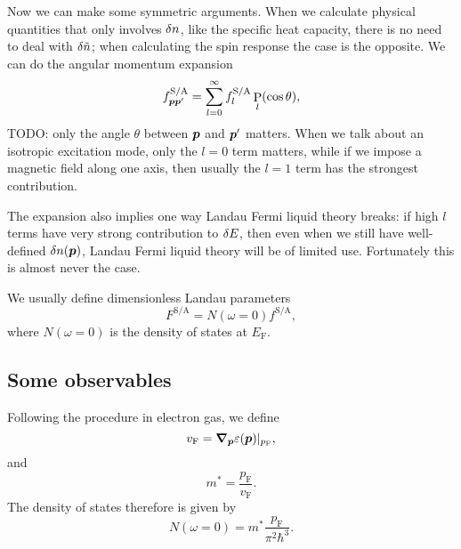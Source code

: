 \documentclass[hyperref, a4paper]{article}
\DeclareMathOperator{\legpoly}{P}
\newcommand*{\efermi}{E_{\text{F}}}
\newcommand*{\pfermi}{p_{\text{F}}}
\newcommand*{\vfermi}{v_{\text{F}}}
\begin{document}
Now we can make some symmetric arguments.
When we calculate physical quantities that only involves $\var{n}$, 
like the specific heat capacity, 
there is no need to deal with $\var{\tilde{n}}$;
when calculating the spin response the case is the opposite. 
We can do the angular momentum expansion 
\begin{equation}
    f^{\text{S/A}}_{\vb*{p} \vb*{p}'} = \sum_{l=0}^{\infty} f^{\text{S/A}}_l \legpoly_l(\cos \theta), 
    \label{eq:landau-liquid.angular-expansion}
\end{equation}
TODO: only the angle $\theta$ between $\vb*{p}$ and $\vb*{p}'$ matters. 
When we talk about an isotropic excitation mode, 
only the $l = 0$ term matters, 
while if we impose a magnetic field along one axis, 
then usually the $l = 1$ term has the strongest contribution. 

The expansion  
also implies one way Landau Fermi liquid theory breaks: 
if high $l$ terms have very strong contribution to $\var{E}$, 
then even when we still have well-defined $\var{n(\vb*{p})}$, 
Landau Fermi liquid theory will be of limited use. 
Fortunately this is almost never the case. 

We usually define dimensionless Landau parameters 
\begin{equation}
    F^{\text{S/A}} = N(\omega = 0) f^{\text{S/A}},
\end{equation}
where $N(\omega = 0)$ is the density of states at $\efermi$.

\subsection{Some observables}

Following the procedure in electron gas, 
we define 
\begin{equation}
    \vfermi = \grad_{\vb*{p}} \varepsilon(\vb*{p}) |_{\pfermi}, 
\end{equation}
and 
\begin{equation}
    m^* = \frac{\pfermi}{\vfermi}.
\end{equation}
The density of states therefore is given by 
\begin{equation}
    N(\omega = 0) = m^* \frac{\pfermi}{\pi^2 \hbar^3}.
\end{equation}
\end{document}
